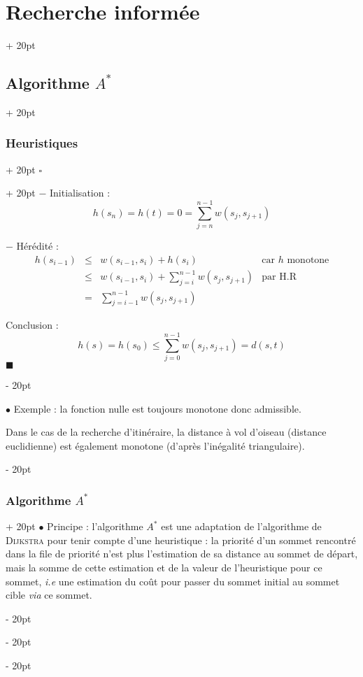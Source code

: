 \documentclass[a4paper, 12pt, twoside]{article}
\renewcommand{\le}{\leqslant}
\newcommand{\ind}[1][20pt]{\advance\leftskip + #1}
\newcommand{\deind}[1][20pt]{\advance\leftskip - #1}
\newenvironment{indt}[2][20pt]{#2 \par \ind[#1]}{\par \deind} %
\newenvironment{proof}[1][{}]{\begin{indt}{$\square$ #1}}{$\blacksquare$ \end{indt}}
\begin{document}
\begin{indt}{\section{Recherche informée}}
\begin{indt}{\subsection{Algorithme $A^*$}}
\begin{indt}{\subsubsection{Heuristiques}}
\begin{proof}
                    $-$ Initialisation :
                    \[
                        h(s_n) = h(t) = 0 = \sum_{j = n}^{n - 1} w(s_j, s_{j + 1})
                    \]
                    
                    $-$ Hérédité :
                    \[
                        \begin{array}{rcll}
                            h(s_{i - 1})
                            &\le& \displaystyle
                            w(s_{i - 1}, s_i) + h(s_i)
                            & \text{car $h$ monotone}
                            \\
                            &\le& \displaystyle
                            w(s_{i - 1}, s_i) + \sum_{j = i}^{n - 1} w(s_j, s_{j + 1})
                            & \text{par H.R}
                            \\
                            &=& \displaystyle
                            \sum_{j = i - 1}^{n - 1} w(s_j, s_{j + 1})
                        \end{array}
                    \]

                    Conclusion :
                    \[
                        h(s) = h(s_0)
                        \le
                        \sum_{j = 0}^{n - 1} w(s_j, s_{j + 1})
                        = d(s, t)
                    \]
                \end{proof}

                \vspace{12pt}
                
                $\bullet$ Exemple : la fonction nulle est toujours monotone donc admissible.

                Dans le cas de la recherche d'itinéraire, la distance à vol d'oiseau (distance euclidienne) est également monotone (d'après l'inégalité triangulaire).
            \end{indt}

            \vspace{12pt}
            
            \begin{indt}{\subsubsection{Algorithme $A^*$}}
                $\bullet$ Principe : l'algorithme $A^*$ est une adaptation de l'algorithme de \textsc{Dijkstra} pour tenir compte d'une heuristique : la priorité d'un sommet rencontré dans la file de priorité n'est plus l'estimation de sa distance au sommet de départ, mais la somme de cette estimation et de la valeur de l'heuristique pour ce sommet, \textit{i.e} une estimation du coût pour passer du sommet initial au sommet cible \textit{via} ce sommet.


\end{indt}
\end{indt}
\end{indt}
\end{document}
